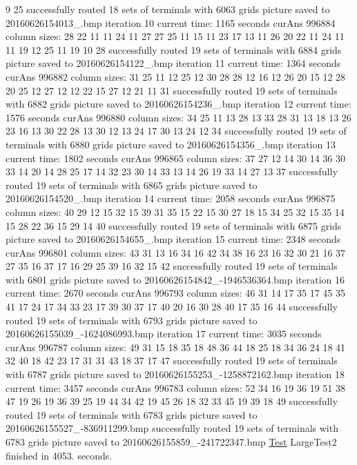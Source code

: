 9 25 successfully routed 18 sets of terminals with 6063 grids picture saved to 20160626154013\+\_.\+bmp iteration 10 current time\+: 1165 seconds cur\+Ans 996884 column sizes\+: 28 22 11 11 24 11 27 27 25 11 15 11 23 17 13 11 26 20 22 11 24 11 11 19 12 25 11 19 10 28 successfully routed 19 sets of terminals with 6884 grids picture saved to 20160626154122\+\_.\+bmp iteration 11 current time\+: 1364 seconds cur\+Ans 996882 column sizes\+: 31 25 11 12 25 12 30 28 28 12 16 12 26 20 15 12 28 20 25 12 27 12 12 22 15 27 12 21 11 31 successfully routed 19 sets of terminals with 6882 grids picture saved to 20160626154236\+\_.\+bmp iteration 12 current time\+: 1576 seconds cur\+Ans 996880 column sizes\+: 34 25 11 13 28 13 33 28 31 13 18 13 26 23 16 13 30 22 28 13 30 12 13 24 17 30 13 24 12 34 successfully routed 19 sets of terminals with 6880 grids picture saved to 20160626154356\+\_.\+bmp iteration 13 current time\+: 1802 seconds cur\+Ans 996865 column sizes\+: 37 27 12 14 30 14 36 30 33 14 20 14 28 25 17 14 32 23 30 14 33 13 14 26 19 33 14 27 13 37 successfully routed 19 sets of terminals with 6865 grids picture saved to 20160626154520\+\_.\+bmp iteration 14 current time\+: 2058 seconds cur\+Ans 996875 column sizes\+: 40 29 12 15 32 15 39 31 35 15 22 15 30 27 18 15 34 25 32 15 35 14 15 28 22 36 15 29 14 40 successfully routed 19 sets of terminals with 6875 grids picture saved to 20160626154655\+\_.\+bmp iteration 15 current time\+: 2348 seconds cur\+Ans 996801 column sizes\+: 43 31 13 16 34 16 42 34 38 16 23 16 32 30 21 16 37 27 35 16 37 17 16 29 25 39 16 32 15 42 successfully routed 19 sets of terminals with 6801 grids picture saved to 20160626154842\+\_\+-\/1946536364.\+bmp iteration 16 current time\+: 2670 seconds cur\+Ans 996793 column sizes\+: 46 31 14 17 35 17 45 35 41 17 24 17 34 33 23 17 39 30 37 17 40 20 16 30 28 40 17 35 16 44 successfully routed 19 sets of terminals with 6793 grids picture saved to 20160626155039\+\_\+-\/1624086993.\+bmp iteration 17 current time\+: 3035 seconds cur\+Ans 996787 column sizes\+: 49 31 15 18 35 18 48 36 44 18 25 18 34 36 24 18 41 32 40 18 42 23 17 31 31 43 18 37 17 47 successfully routed 19 sets of terminals with 6787 grids picture saved to 20160626155253\+\_\+-\/1258872162.\+bmp iteration 18 current time\+: 3457 seconds cur\+Ans 996783 column sizes\+: 52 34 16 19 36 19 51 38 47 19 26 19 36 39 25 19 44 34 42 19 45 26 18 32 33 45 19 39 18 49 successfully routed 19 sets of terminals with 6783 grids picture saved to 20160626155527\+\_\+-\/836911299.\+bmp successfully routed 19 sets of terminals with 6783 grids picture saved to 20160626155859\+\_\+-\/241722347.\+bmp \hyperlink{classTest}{Test} Large\+Test2 finished in 4053. seconds.

